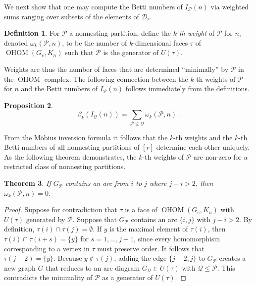 \documentclass[11pt]{amsart}
\newtheorem{theorem}{Theorem}[section]
\theoremstyle{definition}
\newtheorem{definition}[theorem]{Definition}
\newtheorem{proposition}[theorem]{Proposition}
\numberwithin{equation}{section}
\theoremstyle{remark}
\numberwithin{equation}{section}
\begin{document}
We next show that one may compute the Betti numbers of $I_{\mathcal{P}}(n)$ via weighted sums ranging over subsets of the elements of ${\mathcal{D}}_r$.

\begin{definition}
For ${\mathcal{P}}$ a nonnesting partition, define the \emph{$k$-th weight} of ${\mathcal{P}}$ for $n$, denoted $\omega_k({\mathcal{P}},n)$, to be the number of $k$-dimensional faces $\tau$ of $\operatorname{OHOM}(G_e,K_n)$ such that ${\mathcal{P}}$ is the generator of $U(\tau)$.
\end{definition}

Weights are thus the number of faces that are determined ``minimally'' by ${\mathcal{P}}$ in the $\operatorname{OHOM}$ complex.
The following connection between the $k$-th weights of ${\mathcal{P}}$ for $n$ and the Betti numbers of $I_{\mathcal{P}}(n)$ follows immediately from the definitions.

\begin{proposition}
\[\beta_k(I_{\mathcal{Q}}(n))=\sum_{{\mathcal{P}}\leq {\mathcal{Q}}}\omega_k({\mathcal{P}},n) \, .\]
\end{proposition}

From the M\"{o}bius inversion formula \cite[Chapter 3]{StanleyVol1} it follows that the $k$-th weights and the $k$-th Betti numbers of all nonnesting partitions of $[r]$ determine each other uniquely.
As the following theorem demonstrates, the $k$-th weights of ${\mathcal{P}}$ are non-zero for a restricted class of nonnesting partitions.

\begin{theorem}\label{zeroweight}
If $G_{\mathcal{P}}$ contains an arc from $i$ to $j$ where $j-i>2$, then $\omega_k({\mathcal{P}},n)=0$.
\end{theorem}

\begin{proof}
Suppose for contradiction that $\tau$ is a face of $\operatorname{OHOM}(G_e,K_n)$ with $U(\tau)$ generated by ${\mathcal{P}}$.
Suppose that $G_{\mathcal{P}}$ contains an arc $\{i,j\}$ with $j-i>2$.
By definition, $\tau(i)\cap\tau(j)=\emptyset$.
If $y$ is the maximal element of $\tau(i)$, then $\tau(i)\cap\tau(i+s)=\{y\}$ for $s=1,\ldots,j-1$, since every homomorphism corresponding to a vertex in $\tau$ must preserve order.
It follows that $\tau(j-2)=\{y\}$.
Because $y\notin\tau(j)$, adding the edge $\{j-2,j\}$ to $G_{\mathcal{P}}$ creates a new graph $G$ that reduces to an arc diagram $G_{\mathcal{Q}}\in U(\tau)$ with ${\mathcal{Q}}\leq {\mathcal{P}}$.
This contradicts the minimality of ${\mathcal{P}}$ as a generator of $U(\tau)$.
\end{proof}
\end{document}
